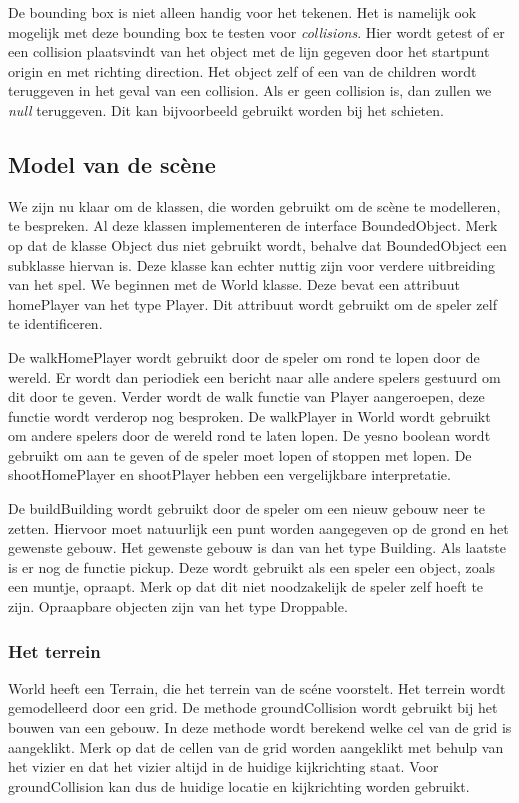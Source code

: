 De bounding box is niet alleen handig voor het tekenen. Het is namelijk ook mogelijk met deze bounding box te testen voor \emph{collisions}. Hier wordt getest of er een collision plaatsvindt van het object met de lijn gegeven door het startpunt origin en met richting direction. Het object zelf of een van de children wordt teruggeven in het geval van een collision. Als er geen collision is, dan zullen we \emph{null} teruggeven. Dit kan bijvoorbeeld gebruikt worden bij het schieten.

\subsection{Model van de sc\`ene}
We zijn nu klaar om de klassen, die worden gebruikt om de sc\`ene te modelleren, te bespreken.  Al deze klassen implementeren de interface BoundedObject. Merk op dat de klasse Object dus niet gebruikt wordt, behalve dat BoundedObject een subklasse hiervan is. Deze klasse kan echter nuttig zijn voor verdere uitbreiding van het spel. We beginnen met de World klasse. Deze bevat een attribuut homePlayer van het type Player. Dit attribuut wordt gebruikt om de speler zelf te identificeren. 

De walkHomePlayer wordt gebruikt door de speler om rond te lopen door de wereld. Er wordt dan periodiek een bericht naar alle andere spelers gestuurd om dit door te geven. Verder wordt de walk functie van Player aangeroepen, deze functie wordt verderop nog besproken. De walkPlayer in World wordt gebruikt om andere spelers door de wereld rond te laten lopen. De yesno boolean wordt gebruikt om aan te geven of de speler moet lopen of stoppen met lopen. De shootHomePlayer en shootPlayer hebben een vergelijkbare interpretatie.

De buildBuilding wordt gebruikt door de speler om een nieuw gebouw neer te zetten. Hiervoor moet natuurlijk een punt worden aangegeven op de grond en het gewenste gebouw. Het gewenste gebouw is dan van het type Building. Als laatste is er nog de functie pickup. Deze wordt gebruikt als een speler een object, zoals een muntje, opraapt. Merk op dat dit niet noodzakelijk de speler zelf hoeft te zijn. Opraapbare objecten zijn van het type Droppable. 

\subsubsection{Het terrein}
World heeft een Terrain, die het terrein van de sc\'ene voorstelt. Het terrein wordt gemodelleerd door een grid. De methode groundCollision wordt gebruikt bij het bouwen van een gebouw. In deze methode wordt berekend welke cel van de grid is aangeklikt. Merk op dat de cellen van de grid worden aangeklikt met behulp van het vizier en dat het vizier altijd in de huidige kijkrichting staat. Voor groundCollision kan dus de huidige locatie en kijkrichting worden gebruikt. 

